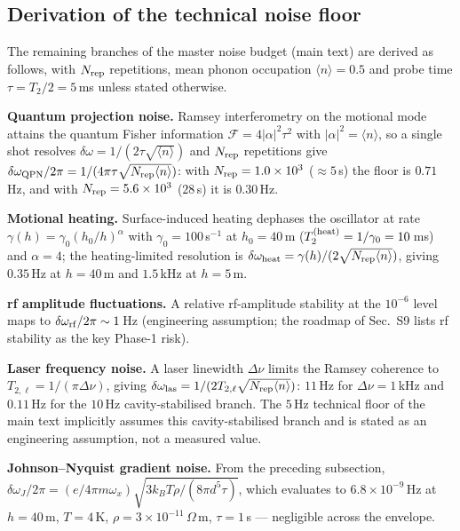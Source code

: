 \documentclass[12pt,a4paper]{article}
\begin{document}
\subsection{Derivation of the technical noise floor}

The remaining branches of the master noise budget (main text) are
derived as follows, with $N_{\rm rep}$ repetitions, mean phonon
occupation $\langle n\rangle=0.5$ and probe time $\tau=T_2/2=5$\,ms
unless stated otherwise.

\textbf{Quantum projection noise.}  Ramsey interferometry on the motional
mode attains the quantum Fisher information
$\mathcal{F}=4|\alpha|^2\tau^2$ with $|\alpha|^2=\langle n\rangle$, so a
single shot resolves $\delta\omega=1/(2\tau\sqrt{\langle n\rangle})$ and
$N_{\rm rep}$ repetitions give
$\delta\omega_{\rm QPN}/2\pi=1/(4\pi\tau\sqrt{N_{\rm rep}\langle n\rangle})$:
with $N_{\rm rep}=1.0\times10^3$ ($\approx5$\,s) the floor is
$0.71$\,Hz, and with $N_{\rm rep}=5.6\times10^3$ ($28$\,s) it is
$0.30$\,Hz.

\textbf{Motional heating.}  Surface-induced heating dephases the
oscillator at rate $\gamma(h)=\gamma_0(h_0/h)^{\alpha}$ with
$\gamma_0=100$\,s$^{-1}$ at $h_0=40$\,\textmu m
($T_2^{\rm(heat)}=1/\gamma_0=10$\,ms) and $\alpha=4$; the
heating-limited resolution is
$\delta\omega_{\rm heat}=\gamma(h)/(2\sqrt{N_{\rm rep}\langle n\rangle})$,
giving $0.35$\,Hz at $h=40$\,\textmu m and $1.5$\,kHz at
$h=5$\,\textmu m.

\textbf{rf amplitude fluctuations.}  A relative rf-amplitude stability
at the $10^{-6}$ level maps to $\delta\omega_{\rm rf}/2\pi\sim1$\,Hz
(engineering assumption; the roadmap of Sec.~S9 lists rf stability as
the key Phase-1 risk).

\textbf{Laser frequency noise.}  A laser linewidth $\Delta\nu$ limits the
Ramsey coherence to $T_{2,\ell}=1/(\pi\Delta\nu)$, giving
$\delta\omega_{\rm las}=1/(2T_{2,\ell}\sqrt{N_{\rm rep}\langle n\rangle})$:
$11$\,Hz for $\Delta\nu=1$\,kHz and $0.11$\,Hz for the $10$\,Hz
cavity-stabilised branch.  The $5$\,Hz technical floor of the main text
implicitly assumes this cavity-stabilised branch and is stated as an
engineering assumption, not a measured value.

\textbf{Johnson--Nyquist gradient noise.}  From the preceding
subsection,
$\delta\omega_J/2\pi=(e/4\pi m\omega_x)\sqrt{3k_BT\rho/(8\pi d^5\tau)}$,
which evaluates to $6.8\times10^{-9}$\,Hz at $h=40$\,\textmu m,
$T=4$\,K, $\rho=3\times10^{-11}$\,$\Omega$\,m, $\tau=1$\,s ---
negligible across the envelope.
\end{document}
